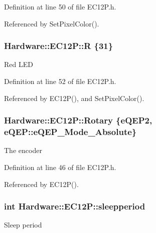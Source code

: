 Definition at line 50 of file E\+C12\+P.\+h.



Referenced by Set\+Pixel\+Color().

\hypertarget{class_hardware_1_1_e_c12_p_a0a4f03a37d709349994e800e44f5c781}{}
\subsubsection[{R}]{ Hardware\+::\+E\+C12\+P\+::\+R \{31\}\hspace{0.3cm}{\ttfamily [private]}}\label{class_hardware_1_1_e_c12_p_a0a4f03a37d709349994e800e44f5c781}
Red L\+E\+D 

Definition at line 52 of file E\+C12\+P.\+h.



Referenced by E\+C12\+P(), and Set\+Pixel\+Color().

\hypertarget{class_hardware_1_1_e_c12_p_abfe8d6ea8948c77d4866ca8a05dbebe9}{}
\subsubsection[{Rotary}]{ Hardware\+::\+E\+C12\+P\+::\+Rotary \{{\bf e\+Q\+E\+P2}, {\bf e\+Q\+E\+P\+::e\+Q\+E\+P\+\_\+\+Mode\+\_\+\+Absolute}\}}\label{class_hardware_1_1_e_c12_p_abfe8d6ea8948c77d4866ca8a05dbebe9}
The encoder 

Definition at line 46 of file E\+C12\+P.\+h.



Referenced by E\+C12\+P().

\hypertarget{class_hardware_1_1_e_c12_p_adff7ed51fd97bac61075c88a06102348}{}
\subsubsection[{sleepperiod}]{\setlength{\rightskip}{0pt plus 5cm}int Hardware\+::\+E\+C12\+P\+::sleepperiod\hspace{0.3cm}{\ttfamily [private]}}\label{class_hardware_1_1_e_c12_p_adff7ed51fd97bac61075c88a06102348}
Sleep period 

